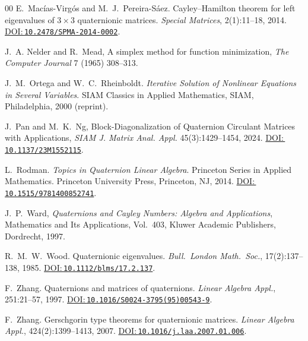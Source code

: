 \documentclass[preprint,12pt]{elsarticle}  %
\theoremstyle{definition}
\theoremstyle{definition}
\theoremstyle{definition}
\theoremstyle{definition}
\theoremstyle{definition}
\theoremstyle{remark}
\theoremstyle{remark}
\theoremstyle{remark}
\newcommand{\DOI}[1]{\href{https://doi.org/#1}{DOI:\,\nolinkurl{#1}}}
\begin{document}
\begin{thebibliography}{00}
E.~Mac{\'i}as-Virg{\'o}s and M.~J.~Pereira-S{\'a}ez.
\newblock Cayley--Hamilton theorem for left eigenvalues of $3\times 3$ quaternionic matrices.
\newblock \emph{Special Matrices}, 2(1):11--18, 2014.
\newblock \DOI{10.2478/SPMA-2014-0002}.

J.~A. Nelder and R.~Mead,
A simplex method for function minimization,
\emph{The Computer Journal} 7 (1965) 308--313.

J.~M.~Ortega and W.~C.~Rheinboldt.
\newblock \emph{Iterative Solution of Nonlinear Equations in Several Variables}.
\newblock SIAM Classics in Applied Mathematics, SIAM, Philadelphia, 2000 (reprint).

J.~Pan and M.~K.~Ng,
\newblock Block-Diagonalization of Quaternion Circulant Matrices with Applications,
\newblock \emph{SIAM J. Matrix Anal. Appl.} 45(3):1429--1454, 2024.
\newblock \DOI{10.1137/23M1552115}.

L.~Rodman.
\newblock \emph{Topics in Quaternion Linear Algebra}.
\newblock Princeton Series in Applied Mathematics.
\newblock Princeton University Press, Princeton, NJ, 2014.
\newblock \DOI{10.1515/9781400852741}.

J.~P.~Ward,
\emph{Quaternions and Cayley Numbers: Algebra and Applications},
Mathematics and Its Applications, Vol.~403,
Kluwer Academic Publishers, Dordrecht, 1997.

R.~M.~W.~Wood.
\newblock Quaternionic eigenvalues.
\newblock \emph{Bull.\ London Math.\ Soc.}, 17(2):137--138, 1985.
\newblock \DOI{10.1112/blms/17.2.137}.

F.~Zhang.
\newblock Quaternions and matrices of quaternions.
\newblock \emph{Linear Algebra Appl.}, 251:21--57, 1997.
\newblock \DOI{10.1016/S0024-3795(95)00543-9}.

F.~Zhang.
\newblock Gerschgorin type theorems for quaternionic matrices.
\newblock \emph{Linear Algebra Appl.}, 424(2):1399--1413, 2007.
\newblock \DOI{10.1016/j.laa.2007.01.006}.

\end{thebibliography}

\end{document}
